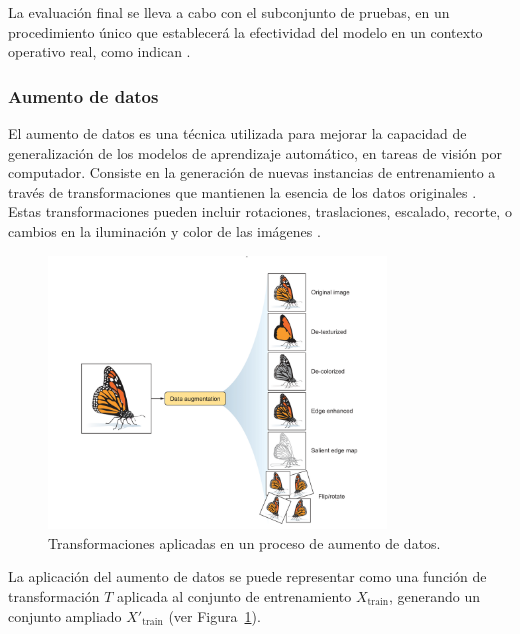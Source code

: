 La evaluación final se lleva a cabo con el subconjunto de pruebas, en un procedimiento único que establecerá la efectividad del modelo en un contexto operativo real, como indican .

\subsubsection{Aumento de datos}

El aumento de datos es una técnica utilizada para mejorar la capacidad de generalización de los modelos de aprendizaje automático, en tareas de visión por computador. Consiste en la generación de nuevas instancias de entrenamiento a través de transformaciones que mantienen la esencia de los datos originales \cite{geron2019hands}. Estas transformaciones pueden incluir rotaciones, traslaciones, escalado, recorte, o cambios en la iluminación y color de las imágenes \cite{elgendy2020deep}.

\begin{figure}[H]
    \begin{center}
        \includegraphics[width=0.8\textwidth]{Images/DataAumentation.png}
    \end{center}
    \caption{Transformaciones aplicadas en un proceso de aumento de datos.}
    \label{fig:DataAumentation}
\end{figure}

La aplicación del aumento de datos se puede representar como una función de transformación \( T \) aplicada al conjunto de entrenamiento \( X_{\text{train}} \), generando un conjunto ampliado \( X'_{\text{train}} \) (ver Figura~\ref{fig:DataAumentation}).

